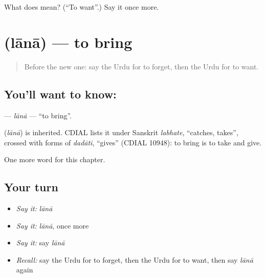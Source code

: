\begin{tcolorbox}[breakable,colback=teal!4,colframe=teal!35!black,title={Before you move on}]
What does  mean? (\textquotedblleft{}To want\textquotedblright{}.) Say it once more.
\end{tcolorbox}
\section[\texorpdfstring{\ur{لانا} (lānā)}{لانا (lānā)}]{ (lānā) — to bring}

\label{lesson:UR-C51-lana}



\begin{quote}
Before the new one: say the Urdu for to forget, then the Urdu for to want.
\end{quote}

\subsection*{You'll want to know: }
\textbf{} — \emph{lānā} — \textquotedblleft{}to bring\textquotedblright{}.

\begin{cousinweb}
\textbf{} (\emph{lānā}) is inherited. CDIAL lists it under Sanskrit \emph{labhate}, \textquotedblleft{}catches, takes\textquotedblright{}, crossed with forms of \emph{dadāti}, \textquotedblleft{}gives\textquotedblright{} (CDIAL 10948): to bring is to take and give.
\end{cousinweb}

\begin{grammarlens}[title={What you've built}]
One more word for this chapter.
\end{grammarlens}

\subsection*{Your turn}
\begin{itemize}
\raggedright
  \item \emph{Say it:} \emph{lānā}
  \item \emph{Say it:} \emph{lānā}, once more
  \item \emph{Say it:} say \emph{lānā}
  \item \emph{Recall:} say the Urdu for to forget, then the Urdu for to want, then say \emph{lānā} again
\end{itemize}

